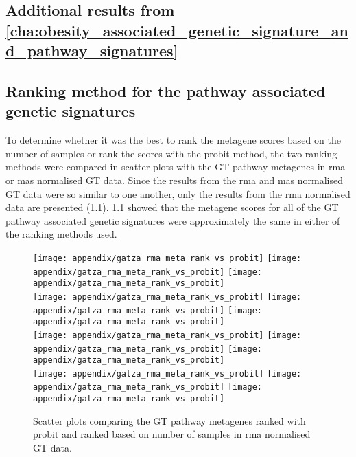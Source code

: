 \begin{appendices}
	\renewcommand{\thesection}{\Alph{chapter}\arabic{section}}

	\chapter{Additional results from \cref{cha:obesity_associated_genetic_signature_and_pathway_signatures}}
	\label{app:b}

	\section{Ranking method for the pathway associated genetic signatures}
	\label{sec:ranking_method_for_the_pathway_associated_genetic_signatures}

	To determine whether it was the best to rank the metagene scores based on the number of samples or rank the scores with the probit method, the two ranking methods were compared in scatter plots with the GT pathway metagenes in \gls{rma} or \gls{mas} normalised GT data.
	Since the results from the \gls{rma} and \gls{mas} normalised GT data were so similar to one another, only the results from the \gls{rma} normalised data are presented (\cref{fig:appendix/rank_scatter}).
	\cref{fig:appendix/rank_scatter} showed that the metagene scores for all of the GT pathway associated genetic signatures were approximately the same in either of the ranking methods used.

	\begin{figure}[htp!]
		\centering
		\texttt{[image: appendix/gatza\_rma\_meta\_rank\_vs\_probit]}
		\texttt{[image: appendix/gatza\_rma\_meta\_rank\_vs\_probit]}
		\texttt{[image: appendix/gatza\_rma\_meta\_rank\_vs\_probit]}\\
		\texttt{[image: appendix/gatza\_rma\_meta\_rank\_vs\_probit]}
		\texttt{[image: appendix/gatza\_rma\_meta\_rank\_vs\_probit]}
		\texttt{[image: appendix/gatza\_rma\_meta\_rank\_vs\_probit]}\\
		\texttt{[image: appendix/gatza\_rma\_meta\_rank\_vs\_probit]}
		\texttt{[image: appendix/gatza\_rma\_meta\_rank\_vs\_probit]}
		\texttt{[image: appendix/gatza\_rma\_meta\_rank\_vs\_probit]}\\
		\texttt{[image: appendix/gatza\_rma\_meta\_rank\_vs\_probit]}
		\texttt{[image: appendix/gatza\_rma\_meta\_rank\_vs\_probit]}
		\texttt{[image: appendix/gatza\_rma\_meta\_rank\_vs\_probit]}\\
		\caption[Comparison of the ranking methods for the pathway metagenes in the \acrshort{rma}-normalised GT data]{Scatter plots comparing the GT pathway metagenes ranked with probit and ranked based on number of samples in \gls{rma} normalised GT data. }
		\label{fig:appendix/rank_scatter}
	\end{figure}


\end{appendices}
